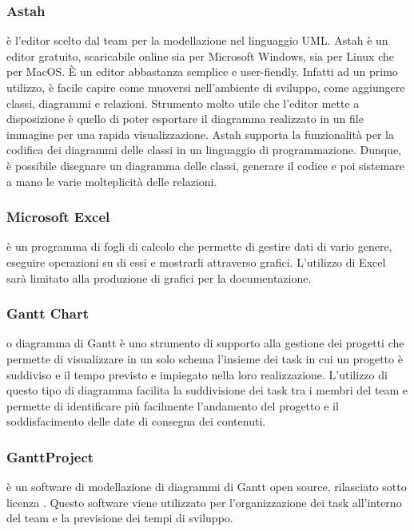 \documentclass[../NormeDiProgetto.tex]{subfiles}
\begin{document}
            \subsubsection{Astah}
             è l'editor scelto dal team per la modellazione nel linguaggio UML. Astah è un editor gratuito, scaricabile online sia per Microsoft Windows, sia per Linux che per MacOS. È un editor abbastanza semplice e user-fiendly. Infatti ad un primo utilizzo, è facile capire come muoversi nell'ambiente di sviluppo, come aggiungere classi, diagrammi e relazioni. Strumento molto utile che l'editor mette a disposizione è quello di poter esportare il diagramma realizzato in un file immagine per una rapida visualizzazione. Astah supporta la funzionalità per la codifica dei diagrammi delle classi in un linguaggio di programmazione. Dunque, è possibile disegnare un diagramma delle classi, generare il codice e poi sistemare a mano le varie molteplicità delle relazioni.

            \subsubsection{Microsoft Excel}
             è un programma di fogli di calcolo che permette di gestire dati di vario genere, eseguire operazioni su di essi e mostrarli attraverso grafici. L'utilizzo di Excel sarà limitato alla produzione di grafici per la documentazione.
            
            \subsubsection{Gantt Chart}
             o diagramma di Gantt è uno strumento di supporto alla gestione dei progetti che permette di visualizzare in un solo schema l'insieme dei task in cui un progetto è suddiviso e il tempo previsto e impiegato nella loro realizzazione. L'utilizzo di questo tipo di diagramma facilita la suddivisione dei task tra i membri del team e permette di identificare più facilmente l'andamento del progetto e il soddisfacimento delle date di consegna dei contenuti.
            
            \subsubsection{GanttProject}
             è un software di modellazione di diagrammi di Gantt open source, rilasciato sotto licenza . Questo software viene utilizzato per l'organizzazione dei task all'interno del team e la previsione dei tempi di sviluppo.
\end{document}
